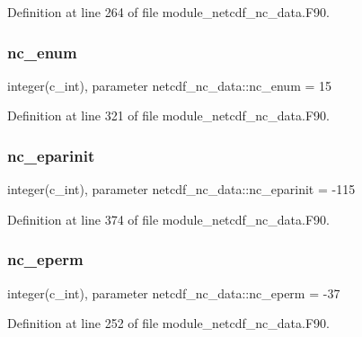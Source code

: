 Definition at line 264 of file module\+\_\+netcdf\+\_\+nc\+\_\+data.\+F90.

\mbox{\label{namespacenetcdf__nc__data_a9c53316bfb47f707160a68ad96edeb25}} 
\subsubsection{\texorpdfstring{nc\+\_\+enum}{nc\_enum}}
{\footnotesize\ttfamily integer(c\+\_\+int), parameter netcdf\+\_\+nc\+\_\+data\+::nc\+\_\+enum = 15}



Definition at line 321 of file module\+\_\+netcdf\+\_\+nc\+\_\+data.\+F90.

\mbox{\label{namespacenetcdf__nc__data_aafdc94b9d4b9e1d38989f30e1854a9f0}} 
\subsubsection{\texorpdfstring{nc\+\_\+eparinit}{nc\_eparinit}}
{\footnotesize\ttfamily integer(c\+\_\+int), parameter netcdf\+\_\+nc\+\_\+data\+::nc\+\_\+eparinit = -\/115}



Definition at line 374 of file module\+\_\+netcdf\+\_\+nc\+\_\+data.\+F90.

\mbox{\label{namespacenetcdf__nc__data_a83704d0b26c22b373336ea1e97ad798d}} 
\subsubsection{\texorpdfstring{nc\+\_\+eperm}{nc\_eperm}}
{\footnotesize\ttfamily integer(c\+\_\+int), parameter netcdf\+\_\+nc\+\_\+data\+::nc\+\_\+eperm = -\/37}



Definition at line 252 of file module\+\_\+netcdf\+\_\+nc\+\_\+data.\+F90.


